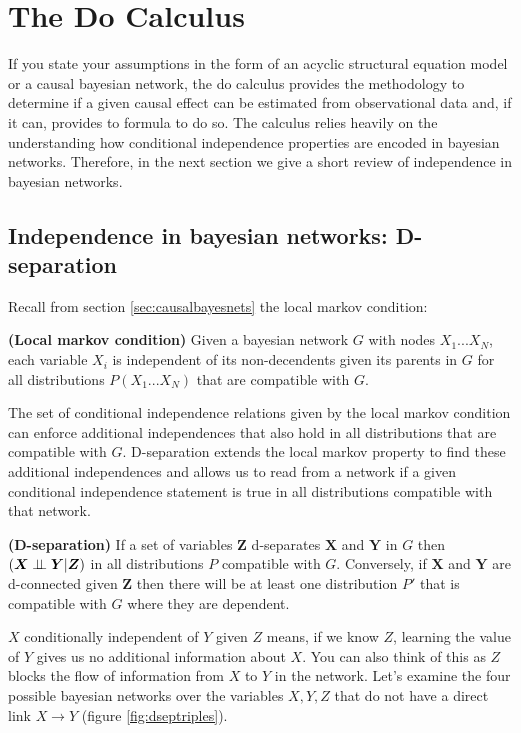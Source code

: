\documentclass[11pt,a4paper]{article}
\begin{document}
\section{The Do Calculus}
If you state your assumptions in the form of an acyclic structural equation model or a causal bayesian network, the do calculus provides the methodology to determine if a given causal effect can be estimated from observational data and, if it can, provides to formula to do so. The calculus relies heavily on the understanding how conditional independence properties are encoded in bayesian networks. Therefore, in the next section we give a short review of independence in bayesian networks.

\subsection{Independence in bayesian networks: D-separation}

Recall from section \ref{sec:causalbayesnets} the local markov condition: 

\begin{theorem}
\textbf{(Local markov condition)} Given a bayesian network $G$ with nodes $X_{1}...X_{N}$, each variable $X_{i}$ is independent of its non-decendents given its parents in $G$ for all distributions $P(X_{1}...X_{N})$ that are compatible with $G$.
\end{theorem}

The set of conditional independence relations given by the local markov condition can enforce additional independences that also hold in all distributions that are compatible with $G$. D-separation extends the local markov property to find these additional independences and allows us to read from a network if a given conditional independence statement is true in all distributions compatible with that network.

\begin{theorem}
\textbf{(D-separation)} If a set of variables $\boldsymbol{Z}$ d-separates $\boldsymbol{X}$ and $\boldsymbol{Y}$ in $G$ then ${(\boldsymbol{X} \perp\!\!\!\perp \boldsymbol{Y}|\boldsymbol{Z})}$ in all distributions $P$ compatible with $G$. Conversely, if $\boldsymbol{X}$ and $\boldsymbol{Y}$ are d-connected given $\boldsymbol{Z}$ then there will be at least one distribution $P'$ that is compatible with $G$ where they are dependent. 
\end{theorem}

$X$ conditionally independent of $Y$ given $Z$ means, if we know $Z$, learning the value of $Y$ gives us no additional information about $X$. You can also think of this as $Z$ blocks the flow of information from $X$ to $Y$ in the network. Let's examine the four possible bayesian networks over the variables ${X,Y,Z}$ that do not have a direct link  ${X \rightarrow Y}$ (figure \ref{fig:dseptriples}). 
\end{document}
